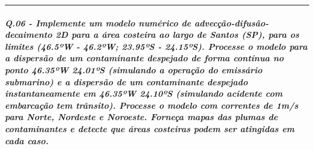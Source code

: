 \documentclass[11pt]{article}
\begin{document}
    \begin{center}\rule{0.5\linewidth}{\linethickness}\end{center}

    \subparagraph{Q.06 - Implemente um modelo numérico de
advecção-difusão-decaimento 2D para a área costeira ao largo de Santos
(SP), para os limites (46.5ºW - 46.2ºW; 23.95ºS - 24.15ºS). Processe o
modelo para a dispersão de um contaminante despejado de forma contínua
no ponto 46.35ºW 24.01ºS (simulando a operação do emissário submarino) e
a dispersão de um contaminante despejado instantaneamente em 46.35ºW
24.10ºS (simulando acidente com embarcação tem trânsito). Processe o
modelo com correntes de 1m/s para Norte, Nordeste e Noroeste. Forneça
mapas das plumas de contaminantes e detecte que áreas costeiras podem
ser atingidas em cada
caso.}\label{q.06---implemente-um-modelo-numuxe9rico-de-advecuxe7uxe3o-difusuxe3o-decaimento-2d-para-a-uxe1rea-costeira-ao-largo-de-santos-sp-para-os-limites-46.5uxbaw---46.2uxbaw-23.95uxbas---24.15uxbas.-processe-o-modelo-para-a-dispersuxe3o-de-um-contaminante-despejado-de-forma-contuxednua-no-ponto-46.35uxbaw-24.01uxbas-simulando-a-operauxe7uxe3o-do-emissuxe1rio-submarino-e-a-dispersuxe3o-de-um-contaminante-despejado-instantaneamente-em-46.35uxbaw-24.10uxbas-simulando-acidente-com-embarcauxe7uxe3o-tem-truxe2nsito.-processe-o-modelo-com-correntes-de-1ms-para-norte-nordeste-e-noroeste.-forneuxe7a-mapas-das-plumas-de-contaminantes-e-detecte-que-uxe1reas-costeiras-podem-ser-atingidas-em-cada-caso.}


    
    
    
    
\end{document}
